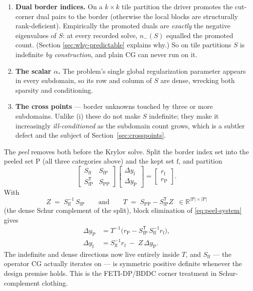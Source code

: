 \documentclass[11pt]{article}
\newcommand{\R}{\mathbb{R}}
\newcommand{\Sff}{S_{\mathrm{ff}}}
\newcommand{\SfP}{S_{\mathrm{fP}}}
\newcommand{\SPP}{S_{\mathrm{PP}}}
\begin{document}
\begin{enumerate}
\item \textbf{Dual border indices.}  On a $k\times k$ tile partition the
  driver promotes the cut-corner dual pairs to the border (otherwise the
  local blocks are structurally rank-deficient).  Empirically the promoted
  duals are \emph{exactly} the negative eigenvalues of $S$: at every recorded
  solve, $n_-(S)$ equalled the promoted count.  (Section
  \ref{sec:why-predictable} explains why.)  So on tile partitions $S$ is
  indefinite \emph{by construction}, and plain CG can never run on it.
\item \textbf{The scalar $\alpha$.}  The problem's single global
  regularization parameter appears in every subdomain, so its row and column
  of $S$ are dense, wrecking both sparsity and conditioning.
\item \textbf{The cross points} --- border unknowns touched by three or more
  subdomains.  Unlike (i) these do not make $S$ indefinite; they make it
  increasingly \emph{ill-conditioned} as the subdomain count grows, which is a
  subtler defect and the subject of Section~\ref{sec:crosspoints}.
\end{enumerate}

The \emph{peel} removes both before the Krylov solve.  Split the border
index set into the peeled set $\mathrm{P}$ (all three categories above) and
the kept set $\mathrm{f}$, and partition
\begin{equation}
  \begin{bmatrix} \Sff & \SfP\\[2pt] \SfP^{\mathsf T} & \SPP \end{bmatrix}
  \begin{bmatrix} \Delta y_{\mathrm f}\\[2pt] \Delta y_{\mathrm P}\end{bmatrix}
  =
  \begin{bmatrix} r_{\mathrm f}\\[2pt] r_{\mathrm P}\end{bmatrix}.
  \label{eq:peel-system}
\end{equation}
With
\begin{equation}
  Z \;=\; \Sff^{-1}\,\SfP
  \qquad\text{and}\qquad
  T \;=\; \SPP - \SfP^{\mathsf T} Z
  \;\;\in\R^{|\mathrm P|\times|\mathrm P|}
  \label{eq:ZT}
\end{equation}
(the dense Schur complement of the split), block elimination of
\eqref{eq:peel-system} gives
\begin{align}
  \Delta y_{\mathrm P} &= T^{-1}\bigl(r_{\mathrm P}
      - \SfP^{\mathsf T}\, \Sff^{-1} r_{\mathrm f}\bigr),
  \label{eq:peel-a}\\
  \Delta y_{\mathrm f} &= \Sff^{-1} r_{\mathrm f} \;-\; Z\,\Delta y_{\mathrm P}.
  \label{eq:peel-b}
\end{align}
The indefinite and dense directions now live entirely inside $T$, and
$\Sff$ --- the operator CG actually iterates on --- is symmetric positive
definite whenever the design premise holds.  This is the FETI-DP/BDDC corner
treatment \cite{farhat2001fetidp,dohrmann2003bddc} in Schur-complement
clothing.
\end{document}
